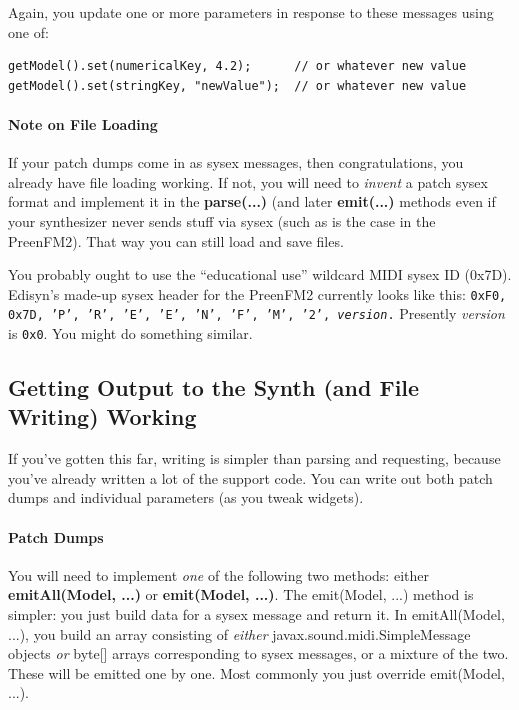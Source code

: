 \documentclass{article}
\begin{document}
Again, you update one or more parameters in response to these messages using one of:

\begin{verbatim}
getModel().set(numericalKey, 4.2);		// or whatever new value
getModel().set(stringKey, "newValue");	// or whatever new value
\end{verbatim}

\paragraph{Note on File Loading}

If your patch dumps come in as sysex messages, then congratulations, you already have file loading working.  If not, you will need to {\it invent} a patch sysex format and implement it in the {\bf parse(...)} (and later {\bf emit(...)} methods even if your synthesizer never sends stuff via sysex (such as is the case in the PreenFM2).  That way you can still load and save files.  

You probably ought to use the ``educational use'' wildcard MIDI sysex ID (0x7D).  Edisyn's made-up sysex header for the PreenFM2 currently looks like this: {\tt 0xF0, 0x7D, 'P', 'R', 'E', 'E', 'N', 'F', 'M', '2', {\it version}.}  Presently {\it version}  is {\tt 0x0}.  You might do something similar.

\subsection{Getting Output to the Synth (and File Writing) Working}

If you've gotten this far, writing is simpler than parsing and requesting, because you've already written a lot of the support code.  You can write out both patch dumps and individual parameters (as you tweak widgets).

\paragraph{Patch Dumps}

You will need to implement {\it one} of the following two methods: either {\bf emitAll(Model, ...)} or {\bf emit(Model, ...)}.  The emit(Model, ...) method is simpler: you just build data for a sysex message and return it.  In emitAll(Model, ...), you build an array consisting of {\it either} javax.sound.midi.SimpleMessage objects {\it or} byte[] arrays corresponding to sysex messages, or a mixture of the two.  These will be emitted one by one.  Most commonly you just override emit(Model, ...).
\end{document}
